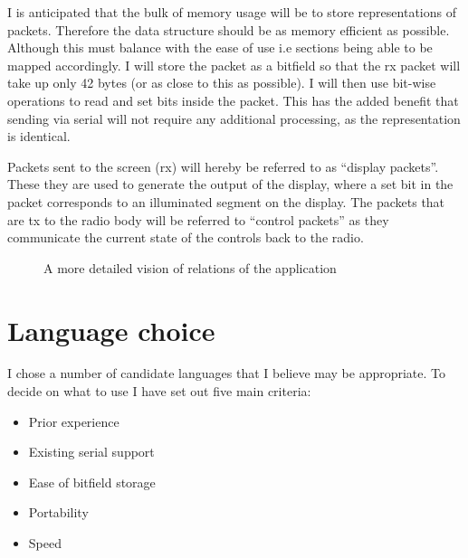 I is anticipated that the bulk of memory usage will be to store representations of packets. Therefore the data structure should be as memory efficient as possible. Although this must balance with the ease of use i.e sections being able to be mapped accordingly. I will store the packet as a bitfield so that the \gls{rx} packet will take up only 42 bytes (or as close to this as possible). I will then use bit-wise operations to read and set bits inside the packet. This has the added benefit that sending via serial will not require any additional processing, as the representation is identical.

Packets sent to the screen (\gls{rx}) will hereby be referred to as ``display packets''. These they are used to generate the output of the display, where a set bit in the packet corresponds to an illuminated segment on the display. The packets that are \gls{tx} to the radio body will be referred to ``control packets'' as they communicate the current state of the controls back to the radio.

\begin{figure}[H]
\centering
    \caption[Overall architecture]{A more detailed vision of relations of the application}
    \label{overall_architecture}
\end{figure}

\section{Language choice}
\label{section:language_choice}

I chose a number of candidate languages that I believe may be appropriate. To decide on what to use I have set out five main criteria: 
\begin{itemize}
    \item Prior experience
    \item Existing serial support
    \item Ease of bitfield storage
    \item Portability
    \item Speed
\end{itemize}

